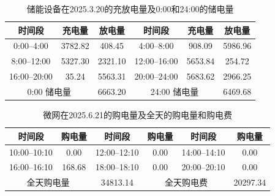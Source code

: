 \documentclass[UTF8]{ctexart}
\begin{document}
    \begin{table}[htbp]
        \centering
        \caption{储能设备在2025.3.20的充放电量及0:00和24:00的储电量}
        \label{tab:q3_battery}
        
        \begin{tabular}{cccccc}
            \toprule
            时间段 & 充电量 & 放电量 &
            时间段 & 充电量 & 放电量 \\
            \midrule
            
            0:00--4:00   & 3782.82 & 408.45 &
            4:00--8:00   & 908.09 & 5986.96 \\
            
            8:00--12:00  & 5327.30 & 2321.10 &
            12:00--16:00 & 5653.84 & 254.72 \\
            
            16:00--20:00 & 35.24 & 5563.31 &
            20:00--24:00 & 5683.62 & 2966.25 \\
            
            \midrule
            
            \multicolumn{2}{c}{0:00 储电量} &
            6663.20 &
            \multicolumn{2}{c}{24:00 储电量} &
            6469.68 \\
            
            \bottomrule
        \end{tabular}
    \end{table}
    
    \begin{table}[htbp]
        \centering
        \caption{微网在2025.6.21的购电量及全天的购电量和购电费}
        \label{tab:q3_tenminute_0621}
        \begin{tabular}{cccccc}
            \toprule
            时间段 & 购电量 & 时间段 & 购电量 & 时间段 & 购电量 \\
            \midrule
            10:00--10:10 & 0.00 &
            12:00--12:10 & 0.00 &
            14:00--14:10 & 0.00 \\
            16:00--16:10 & 168.68 &
            18:00--18:10 & 0.00 &
            20:00--20:10 & 0.00 \\
            \midrule
            \multicolumn{2}{c}{全天购电量} &
            34813.14 &
            \multicolumn{2}{c}{全天购电费} &
            20297.34 \\
            \bottomrule
        \end{tabular}
    \end{table}
    
\end{document}
